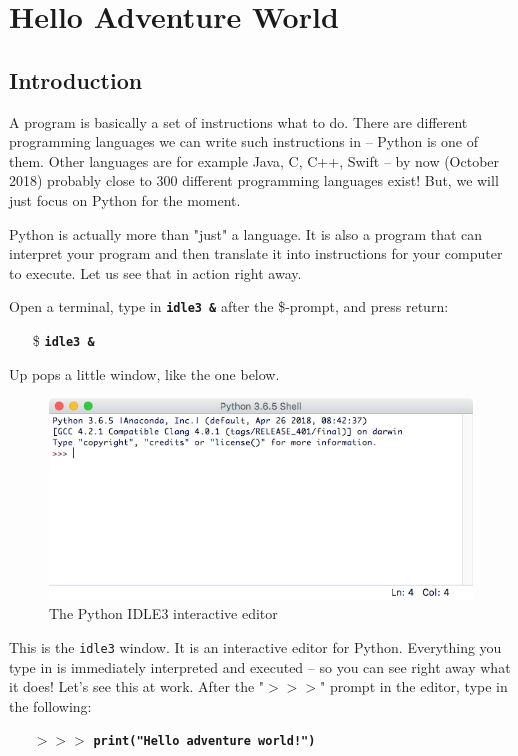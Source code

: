 \chapter{Hello Adventure World} 

\section{Introduction}

A program is basically a set of instructions what to do. There are different programming languages we can write such instructions in -- Python is one of them. Other languages are for example Java, C, C++, Swift -- by now (October 2018) probably close to 300 different programming languages exist! But, we will just focus on Python for the moment. 

Python is actually more than "just" a language. It is also a program that can interpret your program and then translate it into instructions for your computer to execute. Let us see that in action right away. 

Open a terminal, type in \textbf{\texttt{idle3 \&}} after the \$-prompt, and press return: 

\begin{itemize}
\item[\$] \textbf{\texttt{idle3 \&}}
\end{itemize}

Up pops a little window, like the one below.  
 
\begin{figure}[h]
\centerline{\includegraphics[scale=.70]{images/p1ch1-idle3.png}}
\caption{The Python IDLE3 interactive editor}
\end{figure}

This is the \texttt{idle3} window. It is an interactive editor for Python. Everything you type in is immediately interpreted and executed -- so you can see right away what it does! 
Let's see this at work. After the "$>>>$" prompt in the editor, type in the following: 

\begin{itemize}
\item[$>>>$] \textbf{\texttt{print("Hello adventure world!")}}
\end{itemize}



 